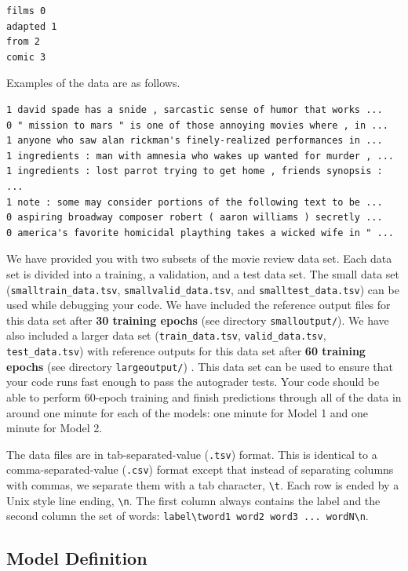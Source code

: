  \begin{lstlisting}
films 0
adapted 1
from 2
comic 3
\end{lstlisting}
 
 Examples of the data are as follows.
 
 
\begin{lstlisting}
1 david spade has a snide , sarcastic sense of humor that works ... 
0 " mission to mars " is one of those annoying movies where , in ...
1 anyone who saw alan rickman's finely-realized performances in ...
1 ingredients : man with amnesia who wakes up wanted for murder , ...
1 ingredients : lost parrot trying to get home , friends synopsis : ... 
1 note : some may consider portions of the following text to be ...
0 aspiring broadway composer robert ( aaron williams ) secretly ...
0 america's favorite homicidal plaything takes a wicked wife in " ...
\end{lstlisting}

We have provided you with two subsets of the movie review data set. Each data set is divided into a training, a validation, and a test data set.
%
The small data set (\lstinline{smalltrain_data.tsv}, \lstinline{smallvalid_data.tsv}, and \lstinline{smalltest_data.tsv}) can be used while debugging your code. We have included the reference output files for this data set after \textbf{30 training epochs} (see directory \lstinline{smalloutput/}). 
%
We have also included a larger data set (\lstinline{train_data.tsv}, \lstinline{valid_data.tsv}, \lstinline{test_data.tsv}) with reference outputs for this data set after \textbf{60 training epochs}  (see directory \lstinline{largeoutput/}) . This data set can be used to ensure that your code runs fast enough to pass the autograder tests. Your code should be able to perform 60-epoch training and finish  predictions through all of the data in around one minute for each of the models: one minute for Model 1 and one minute for Model 2.

The data files are in tab-separated-value (\lstinline{.tsv}) format. This is identical to a comma-separated-value (\lstinline{.csv}) format except that instead of separating columns with commas, we separate them with a tab character, \lstinline{\t}. Each row is ended by a Unix style line ending, \lstinline{\n}. The first column always contains the label and the second column the set of words:  \lstinline{label\tword1 word2 word3 ... wordN\n}.
 
\subsection{Model Definition}\label{modeldescript}
 

